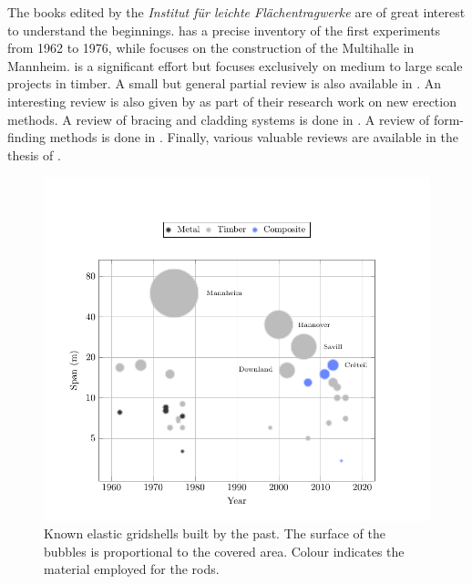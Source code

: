 The books edited by the \emph{Institut für leichte Flächentragwerke} are of great interest to understand the beginnings.  \cite{IL10} has a precise inventory of the first experiments from 1962 to 1976, while  \cite{IL13} focuses on the construction of the Multihalle in Mannheim.  \cite{Chilton2017} is a significant effort but focuses exclusively on medium to large scale projects in timber. A small but general partial review is also available in \cite{Collins2016}. An interesting review is also given by \citet{Quinn2014} as part of their research work on new erection methods. A review of bracing and cladding systems is done in \cite{Cuvilliers2017}. A review of form-finding methods is done in \cite{Vaulot2016}. Finally, various valuable reviews are available in the thesis of \citet{Douthe2007,Bouhaya2010,Tayeb2015a,Lafuente2015}.
\begin{figure}[p]
\begin{fullpage}
	\centering
	\includegraphics[]{ch2_gridshell/plot/1_projects/build.pdf}
	\caption[Known elastic gridshells built by the past.]{Known elastic gridshells built by the past. The surface of the bubbles is proportional to the covered area. Colour indicates the material employed for the rods.}
	\label{fig:projectsbymaterial}
\end{fullpage}
\end{figure}

